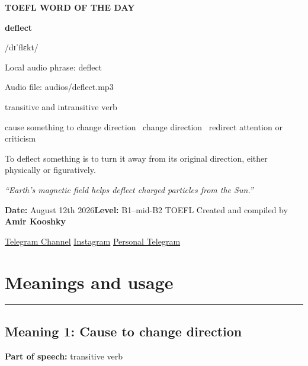 \documentclass[11pt]{article}
\newcommand{\sectionrule}{\par\vspace{-0.5em}\noindent\textcolor{Accent}{\rule{\linewidth}{0.6pt}}\par}
\begin{document}
\begin{center}
{\sffamily\bfseries\color{Accent} TOEFL WORD OF THE DAY\par}
\vspace{8mm}
{\fontsize{42}{48}\selectfont\bfseries deflect\par}
\vspace{2mm}
{\Large\sffamily\color{Accent} /dɪˈflɛkt/\par}
\vspace{2mm}
{\small\sffamily Local audio phrase: deflect\par}
{\small\sffamily Audio file: audios/deflect.mp3\par}
\vspace{2mm}
{\large\sffamily\color{Muted} transitive and intransitive verb\par}
\vspace{5mm}
{\sffamily cause something to change direction \textbullet\ change direction \textbullet\ redirect attention or criticism\par}
\vspace{6mm}
{\large To deflect something is to turn it away from its original direction, either physically or figuratively.\par}
\vspace{6mm}
\begin{minipage}{0.84\textwidth}
\itshape “Earth's magnetic field helps deflect charged particles from the Sun.”
\end{minipage}\par
\vspace{10mm}
\textbf{Date:} August 12th 2026\quad\textbullet\quad \textbf{Level:} B1--mid-B2 TOEFL
\vfill
Created and compiled by \textbf{Amir Kooshky}\par
\vspace{2mm}
\href{https://t.me/KooshkyTOEFL}{Telegram Channel}\quad\textbullet\quad
\href{https://www.instagram.com/kooshkytoefl}{Instagram}\quad\textbullet\quad
\href{https://t.me/KooshkyTOEFL\_pv}{Personal Telegram}
\end{center}
\newpage
\tableofcontents
\newpage

\section{Meanings and usage}
\sectionrule
\subsection{Meaning 1: Cause to change direction}
\textbf{Part of speech:} transitive verb
\end{document}
